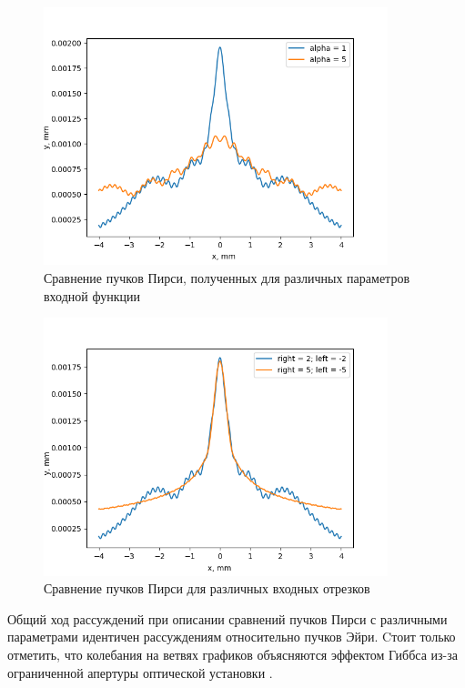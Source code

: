 {    \begin{figure}[H]
        \begin{center}
            \includegraphics[width=10cm]{plots/pe_param_comparison}
            \caption{Сравнение пучков Пирси, полученных для различных параметров входной функции}
            \label{pe_param_comparison}
        \end{center}
    \end{figure}

    \begin{figure}[H]
        \begin{center}
            \includegraphics[width=10cm]{plots/pe_input_comparison}
            \caption{Сравнение пучков Пирси для различных входных отрезков}
            \label{pe_input_comparison}
        \end{center}
    \end{figure}

    Общий ход рассуждений при описании сравнений пучков Пирси с различными
    параметрами идентичен рассуждениям относительно пучков Эйри.
    Cтоит только отметить, что колебания на ветвях графиков объясняются эффектом Гиббса
    из-за ограниченной апертуры оптической установки \cite{gibbs}.

}
